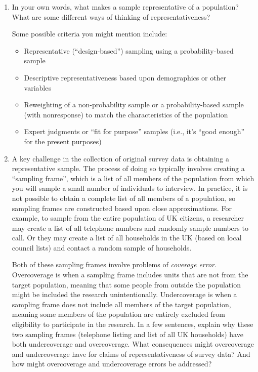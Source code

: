 \documentclass[a4paper]{exam}
\begin{document}
\begin{enumerate}
\item In your own words, what makes a sample representative of a population? What are some different ways of thinking of representativeness?

\begin{solution}

Some possible criteria you might mention include:

\begin{itemize}
\item Representative (``design-based'') sampling using a probability-based sample
\item Descriptive representativeness based upon demographics or other variables
\item Reweighting of a non-probability sample or a probability-based sample (with nonresponse) to match the characteristics of the population
\item Expert judgments or ``fit for purpose'' samples (i.e., it's ``good enough'' for the present purposes)
\end{itemize}

\end{solution}

\item A key challenge in the collection of original survey data is obtaining a representative sample. The process of doing so typically involves creating a ``sampling frame'', which is a list of all members of the population from which you will sample a small number of individuals to interview. In practice, it is not possible to obtain a complete list of all members of a population, so sampling frames are constructed based upon close approximations. For example, to sample from the entire population of UK citizens, a researcher may create a list of all telephone numbers and randomly sample numbers to call. Or they may create a list of all households in the UK (based on local council lists) and contact a random sample of households.

Both of these sampling frames involve problems of \textit{coverage error}. Overcoverage is when a sampling frame includes units that are not from the target population, meaning that some people from outside the population might be included the research unintentionally. Undercoverage is when a sampling frame does not include all members of the target population, meaning some members of the population are entirely excluded from eligibility to participate in the research. In a few sentences, explain why these two sampling frames (telephone listing and list of all UK households) have both undercoverage and overcoverage. What consequences might overcoverage and undercoverage have for claims of representativeness of survey data? And how might overcoverage and undercoverage errors be addressed?


\end{enumerate}
\end{document}
